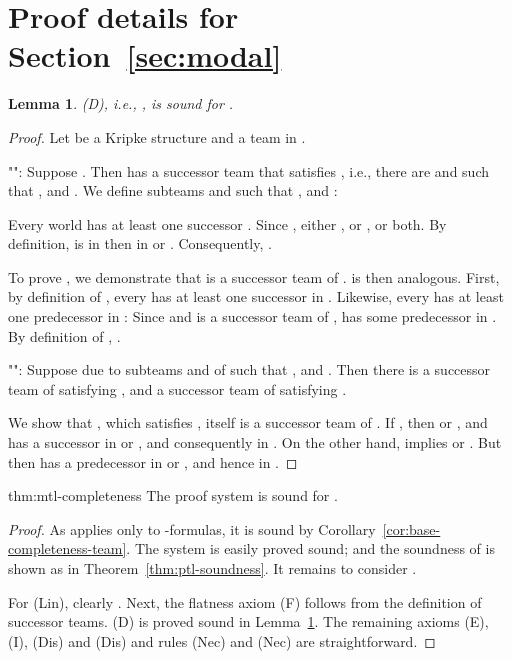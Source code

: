\documentclass[a4paper,english,fleqn,11pt,final]{scrartcl}
\makeatletter
\newcommand{\ie}{i.e.\@\xspace}
\newcommand{\Deriv}[1]{{\normalfont\textsf{#1}}}
\theoremstyle{plain}
\newtheorem{lemma}[theorem]{Lemma}
\theoremstyle{definition}
\makeatother
\begin{document}
\section{Proof details for Section~\ref{sec:modal}}

\begin{lemma}\label{lem:diamond-sound}
\Deriv{(D)}, \ie, , is sound for .
\end{lemma}
\begin{proof}
Let  be a Kripke structure and  a team in .

"":
Suppose .
Then  has a successor team  that satisfies , \ie, there are  and  such that ,  and .
We define subteams  and  such that ,  and :

Every world  has at least one successor .
Since , either , or , or both.
By definition,  is in then in  or .
Consequently, .

To prove , we demonstrate that  is a successor team of .
 is then analogous.
First, by definition of , every  has at least one successor in .
Likewise, every  has at least one predecessor in :
Since  and  is a successor team of ,  has some predecessor  in .
By definition of , .

"":
Suppose  due to subteams  and  of  such that ,  and .
Then there is a successor team  of  satisfying , and a successor team  of  satisfying .

We show that , which satisfies , itself is a successor team of .
If , then  or , and  has a successor in  or , and consequently in .
On the other hand,  implies  or .
But then  has a predecessor in  or , and hence in .
\end{proof}

\begin{reptheorem}{thm:mtl-completeness}
The proof system  is sound for .
\end{reptheorem}
\begin{proof}
As  applies only to -formulas, it is sound by Corollary~\ref{cor:base-completeness-team}.
The system  is easily proved sound; and the soundness of  is shown as in Theorem~\ref{thm:ptl-soundness}.
It remains to consider .

For \Deriv{(Lin)}, clearly .
Next, the flatness axiom \Deriv{(F)} follows from the definition of successor teams.
\Deriv{(D)} is proved sound in Lemma~\ref{lem:diamond-sound}.
The remaining axioms \Deriv{(E)}, \Deriv{(I)}, \Deriv{(Dis)} and \Deriv{(Dis)} and rules  \Deriv{(Nec)} and \Deriv{(Nec)} are straightforward.
\end{proof}
\end{document}
